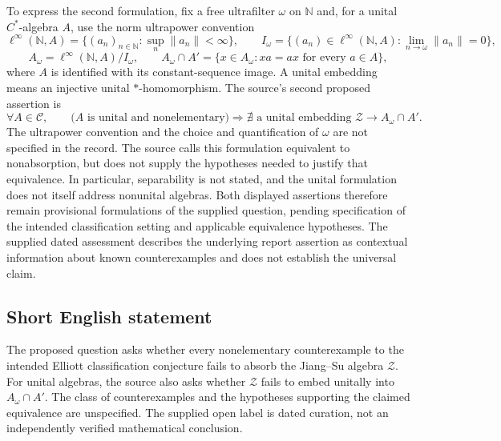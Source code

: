 \documentclass[11pt]{article}
\newcommand{\N}{\mathbb{N}}
\begin{document}
To express the second formulation, fix a free ultrafilter \(\omega\) on \(\N\) and, for a unital \(C^*\)-algebra \(A\), use the norm ultrapower convention
\[
\ell^\infty(\N,A)=\{(a_n)_{n\in\N}:\sup_n\|a_n\|<\infty\},
\qquad
I_\omega=\{(a_n)\in\ell^\infty(\N,A):\lim_{n\to\omega}\|a_n\|=0\},
\]
\[
A_\omega=\ell^\infty(\N,A)/I_\omega,
\qquad
A_\omega\cap A'
=\{x\in A_\omega:xa=ax\text{ for every }a\in A\},
\]
where \(A\) is identified with its constant-sequence image. A unital embedding means an injective unital \(*\)-homomorphism. The source's second proposed assertion is
\[
\forall A\in\mathscr C,\qquad
\bigl(A\text{ is unital and nonelementary}\bigr)
\Longrightarrow
\nexists\text{ a unital embedding }
\mathcal Z\longrightarrow A_\omega\cap A'.
\]
The ultrapower convention and the choice and quantification of \(\omega\) are not specified in the record. The source calls this formulation equivalent to nonabsorption, but does not supply the hypotheses needed to justify that equivalence. In particular, separability is not stated, and the unital formulation does not itself address nonunital algebras. Both displayed assertions therefore remain provisional formulations of the supplied question, pending specification of the intended classification setting and applicable equivalence hypotheses. The supplied dated assessment describes the underlying report assertion as contextual information about known counterexamples and does not establish the universal claim.
\subsection{Short English statement}
The proposed question asks whether every nonelementary counterexample to the intended Elliott classification conjecture fails to absorb the Jiang--Su algebra \(\mathcal Z\). For unital algebras, the source also asks whether \(\mathcal Z\) fails to embed unitally into \(A_\omega\cap A'\). The class of counterexamples and the hypotheses supporting the claimed equivalence are unspecified. The supplied open label is dated curation, not an independently verified mathematical conclusion.
\end{document}
